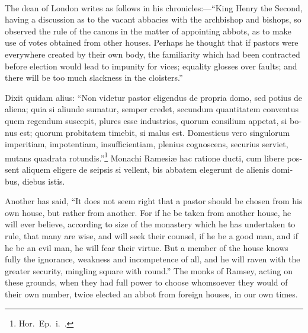 \documentclass[10pt]{book}
\newcounter{engnote}
\newcommand{\engnotenum}{\textsuperscript{\arabic{engnote}\stepcounter{engnote}}}
\newcounter{gloss}
\newcounter{gloss_text}
\begin{document}
\begin{paracol}{2}
\begin{otherlanguage}{latin}
\end{otherlanguage}

\switchcolumn

The dean of London\engnotenum{} writes as follows in his chronicles:---``King Henry the Second, having a discussion as to the vacant abbacies with the archbishop and bishops, so observed the rule of the canons in the matter of appointing abbots, as to make use of votes obtained from other houses. Perhaps he thought that if pastors were everywhere created by their own body, the familiarity which had been contracted before election would lead to impunity for vices; equality glosses over faults; and there will be too much slackness in the cloisters.''

\switchcolumn*

\begin{otherlanguage}{latin}
Dixit quidam alius: ``Non videtur pastor eligendus de propria domo, sed potius de aliena; quia si aliunde sumatur, semper credet, secundum quantitatem conventus quem regendum suscepit, plures esse industrios, quorum consilium appetat, si bonus est; quorum probitatem timebit, si malus est. Domesticus vero singulorum imperitiam, impotentiam, insufficientiam, plenius cognoscens, securius serviet, mutans quadrata rotundis.''\footnote[\textdagger]{Hor.\ Ep.\ i.\ .} Monachi Ramesi\ae{} hac ratione ducti, cum libere possent aliquem eligere de seipsis si vellent, bis abbatem elegerunt de alienis domibus, diebus istis.
\end{otherlanguage}

\switchcolumn

Another has said, ``It does not seem right that a pastor should be chosen from his own house, but rather from another. For if he be taken from another house, he will ever believe, according to size of the monastery which he has undertaken to rule, that many are wise, and will seek their counsel, if he be a good man, and if he be an evil man, he will fear their virtue. But a member of the house knows fully the ignorance, weakness and incompetence of all, and he will raven with the greater security, mingling square with round.'' The monks of Ramsey, acting on these grounds, when they had full power to choose whomsoever they would of their own number, twice elected an abbot from foreign houses, in our own times.

\switchcolumn*


\end{paracol}
\end{document}
